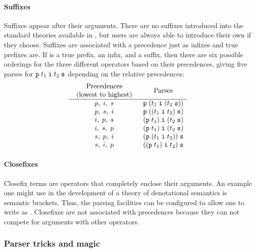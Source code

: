 {\paragraph{Suffixes}

Suffixes appear after their arguments.  There are no suffixes
introduced into the standard theories available in \HOL{}, but users
are always able to introduce their own if they choose.  Suffixes are
associated with a precedence just as infixes and true prefixes are.
If  is a true prefix,  an infix, and  a
suffix, then there are six possible orderings for the three different
operators based on their precedences, giving five parses for
$\holtxt{p}\; t_1\; \holtxt{i}\; t_2\; \holtxt{s}$ depending on the
relative precedences:
\[
\begin{array}{cl}
\mbox{\begin{tabular}{c}Precedences\\(lowest to highest)\end{tabular}} &
\multicolumn{1}{c}{\mbox{Parses}}\\
\hline
p,\;i,\;s & \holtxt{p}\;(t_1\;\holtxt{i}\;(t_2\;\holtxt{s}))\\
p,\;s,\;i & \holtxt{p}\;((t_1\;\holtxt{i}\;t_2)\;\holtxt{s})\\
i,\;p,\;s & (\holtxt{p}\;t_1)\;\holtxt{i}\;(t_2\;\holtxt{s})\\
i,\;s,\;p & (\holtxt{p}\;t_1)\;\holtxt{i}\;(t_2\;\holtxt{s})\\
s,\;p,\;i & (\holtxt{p}\;(t_1\;\holtxt{i}\;t_2))\;\holtxt{s}\\
s,\;i,\;p & ((\holtxt{p}\;t_1)\;\holtxt{i}\;t_2)\;\holtxt{s}\\
\end{array}
\]

\paragraph{Closefixes}

Closefix terms are operators that completely enclose their arguments.
An example one might use in the development of a theory of
denotational semantics is semantic brackets.  Thus, the \HOL{} parsing
facilities can be configured to allow one to write 
as \holtxt{[| x |]}.  Closefixes are not associated with precedences
because they can not compete for arguments with other operators.


\subsubsection{Parser tricks and magic}

}
